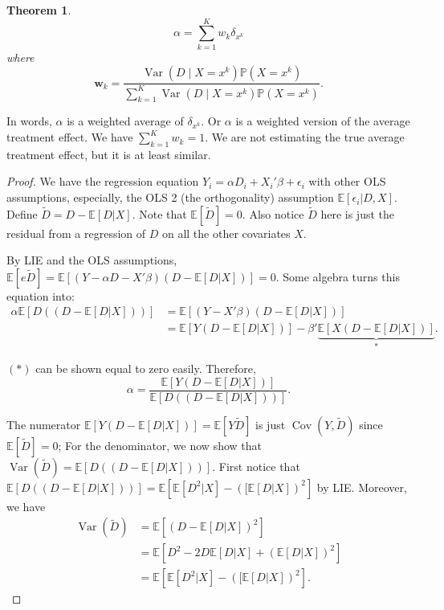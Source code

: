 \documentclass[11pt,a4paper]{amsart}
\theoremstyle{plain}
\newtheorem{theorem}{Theorem}
\theoremstyle{definition}
\begin{document}
	\begin{theorem}
		\[	\alpha =\sum_{k=1}^{K} w_{k} \delta_{x^{k}}	\]
		where
		\[	\boldsymbol{w}_{k}=\frac{\operatorname{Var}\left( D \mid X= x^{k}\right) \mathbb{P}\left(X=x^{k}\right)}{\sum_{k=1}^{K} \operatorname{Var}\left(D \mid X= x^{k}\right) \mathbb{P}\left(X=x^{k}\right)}.	\]
	\end{theorem}
	In words, $\alpha$ is a weighted average of $\delta_{x^{k}}$.  Or $\alpha$ is a weighted version of the average treatment effect. We have $\sum_{k=1}^{K} w_{k} =1$. We are not estimating the true average treatment effect, but it is at least similar.
	\begin{proof}
		We have the regression equation $Y_{i} = \alpha D_{i} + X_{i}'\beta + \epsilon_{i}$ with other OLS assumptions, especially, the OLS 2 (the orthogonality) assumption $\mathbb{E}[\epsilon_{i} | D,X]$. Define $\tilde{D} = D - \mathbb{E}[D|X]$. Note that $\mathbb{E}[\tilde{D}] = 0$. Also notice $\tilde{D}$ here is just the residual from a regression of $D$ on all the other covariates $X$. \par 
		By LIE and the OLS assumptions, $\mathbb{E}[e\tilde{D}] = \mathbb{E}[(Y - \alpha D - X'\beta )(D - \mathbb{E}[D|X])] = 0$. Some algebra turns this equation into:
		\[	\begin{aligned}
			\alpha \mathbb{E}\left[D((D - \mathbb{E}[D|X]))\right] &= \mathbb{E}\left[(Y - X'\beta )(D - \mathbb{E}[D|X])\right] \\
			&= \mathbb{E}\left[Y (D - \mathbb{E}[D|X])\right] - \beta' \underbrace{\mathbb{E}\left[X(D - \mathbb{E}[D|X])\right] }_{*}.
		\end{aligned}	\]
		
		$(*)$ can be shown equal to zero easily. Therefore, 
		\[	\alpha = \frac{\mathbb{E}\left[Y (D - \mathbb{E}[D|X])\right] }{\mathbb{E}\left[D((D - \mathbb{E}[D|X]))\right] }.	\]
		
		The numerator $\mathbb{E}[Y (D - \mathbb{E}[D|X])] = \mathbb{E}[Y \tilde{D}]$ is just $\operatorname{Cov}(Y, \tilde{D})$ since $\mathbb{E}[\tilde{D}] = 0$; For the denominator, we now show that $\operatorname{Var}(\tilde{D}) = \mathbb{E}\left[D((D - \mathbb{E}[D|X]))\right]$. First notice that $\mathbb{E}\left[D((D - \mathbb{E}[D|X]))\right] = \mathbb{E}\left[\mathbb{E}[D^{2}|X] - ([\mathbb{E}[D|X] )^{2}\right]$ by LIE. Moreover, we have 
		\[	\begin{aligned}
		\operatorname{Var}(\tilde{D}) &= \mathbb{E}\left[(D-\mathbb{E}[D|X])^{2}\right] \\
		&= \mathbb{E}\left[D^{2} - 2D\mathbb{E}[D|X]+ (\mathbb{E}[D|X])^{2}\right] \\
		&=  \mathbb{E}\left[\mathbb{E}[D^{2}|X] - ([\mathbb{E}[D|X] )^{2}\right].
		\end{aligned}	\]
		

\end{proof}
\end{document}
